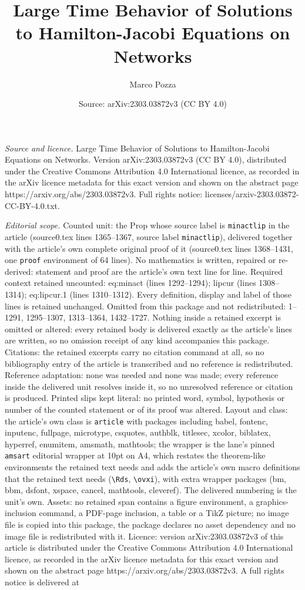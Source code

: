 \documentclass[10pt,a4paper]{amsart}
\title[Large Time Behavior of Solutions to Hamilton-Jacobi Equation]{Large Time Behavior of Solutions to Hamilton-Jacobi Equations on Networks}
\author{Marco Pozza}
\date{Source: arXiv:2303.03872v3 (CC BY 4.0)}
\begin{document}
\maketitle

\noindent\emph{Source and licence.} Large Time Behavior of Solutions to Hamilton-Jacobi Equations on Networks. Version arXiv:2303.03872v3 (CC BY 4.0), distributed under the Creative Commons Attribution 4.0 International licence, as recorded in the arXiv licence metadata for this exact version and shown on the abstract page https://arxiv.org/abs/2303.03872v3. Full rights notice: licenses/arxiv-2303.03872-CC-BY-4.0.txt.\par\smallskip

\noindent\textit{Editorial scope.} Counted unit: the Prop whose source label is \texttt{minactlip} in the article (source0.tex lines 1365--1367, source label \texttt{minactlip}), delivered together with the article's own complete original proof of it (source0.tex lines 1368--1431, one \texttt{proof} environment of 64 lines). No mathematics is written, repaired or re-derived: statement and proof are the article's own text line for line. Required context retained uncounted: eq:minact (lines 1292--1294); lipcur (lines 1308--1314); eq:lipcur.1 (lines 1310--1312). Every definition, display and label of those lines is retained unchanged. Omitted from this package and not redistributed: 1--1291, 1295--1307, 1313--1364, 1432--1727. Nothing inside a retained excerpt is omitted or altered: every retained body is delivered exactly as the article's lines are written, so no omission receipt of any kind accompanies this package. Citations: the retained excerpts carry no citation command at all, so no bibliography entry of the article is transcribed and no reference is redistributed. Reference adaptation: none was needed and none was made; every reference inside the delivered unit resolves inside it, so no unresolved reference or citation is produced. Printed slips kept literal: no printed word, symbol, hypothesis or number of the counted statement or of its proof was altered. Layout and class: the article's own class is \texttt{article} with packages including babel, fontenc, inputenc, fullpage, microtype, csquotes, authblk, titlesec, xcolor, biblatex, hyperref, enumitem, amsmath, mathtools; the wrapper is the lane's pinned \texttt{amsart} editorial wrapper at 10pt on A4, which restates the theorem-like environments the retained text needs and adds the article's own macro definitions that the retained text needs (\texttt{\textbackslash Rds}, \texttt{\textbackslash ovxi}), with extra wrapper packages (bm, bbm, dsfont, xspace, cancel, mathtools, cleveref). The delivered numbering is the unit's own. Assets: no retained span contains a figure environment, a graphics-inclusion command, a PDF-page inclusion, a table or a TikZ picture; no image file is copied into this package, the package declares no asset dependency and no image file is redistributed with it. Licence: version arXiv:2303.03872v3 of this article is distributed under the Creative Commons Attribution 4.0 International licence, as recorded in the arXiv licence metadata for this exact version and shown on the abstract page https://arxiv.org/abs/2303.03872v3. A full rights notice is delivered at 
\end{document}
